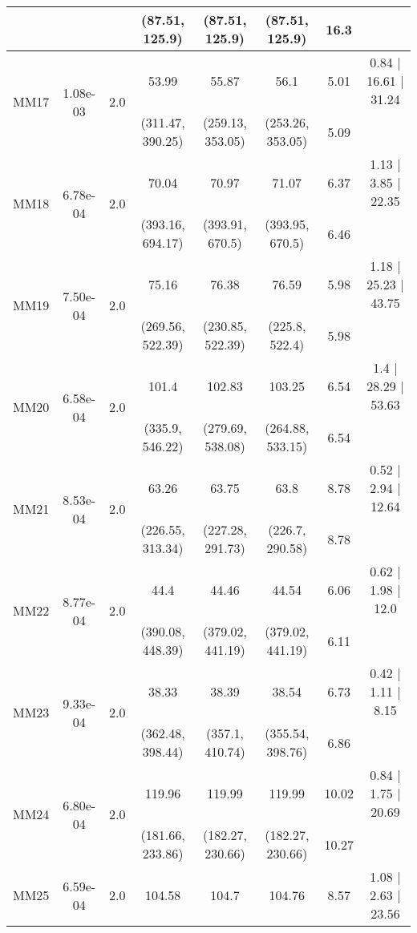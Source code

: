 \begin{longtable}{|c|c|c|c|c|c|c|c|}
	 &  &  & (87.51, 125.9) & (87.51, 125.9) & (87.51, 125.9) & 16.3 & \\
 	\hline
	\multirow{2}{*}{MM17} & \multirow{2}{*}{1.08e-03} & \multirow{2}{*}{2.0} & 53.99 & 55.87 & 56.1 & 5.01 & 0.84 $\mid$ 16.61 $\mid$ 31.24\\
	 &  &  & (311.47, 390.25) & (259.13, 353.05) & (253.26, 353.05) & 5.09 & \\
 	\hline
	\multirow{2}{*}{MM18} & \multirow{2}{*}{6.78e-04} & \multirow{2}{*}{2.0} & 70.04 & 70.97 & 71.07 & 6.37 & 1.13 $\mid$ 3.85 $\mid$ 22.35\\
	 &  &  & (393.16, 694.17) & (393.91, 670.5) & (393.95, 670.5) & 6.46 & \\
 	\hline
	\multirow{2}{*}{MM19} & \multirow{2}{*}{7.50e-04} & \multirow{2}{*}{2.0} & 75.16 & 76.38 & 76.59 & 5.98 & 1.18 $\mid$ 25.23 $\mid$ 43.75\\
	 &  &  & (269.56, 522.39) & (230.85, 522.39) & (225.8, 522.4) & 5.98 & \\
 	\hline
	\multirow{2}{*}{MM20} & \multirow{2}{*}{6.58e-04} & \multirow{2}{*}{2.0} & 101.4 & 102.83 & 103.25 & 6.54 & 1.4 $\mid$ 28.29 $\mid$ 53.63\\
	 &  &  & (335.9, 546.22) & (279.69, 538.08) & (264.88, 533.15) & 6.54 & \\
 	\hline
	\multirow{2}{*}{MM21} & \multirow{2}{*}{8.53e-04} & \multirow{2}{*}{2.0} & 63.26 & 63.75 & 63.8 & 8.78 & 0.52 $\mid$ 2.94 $\mid$ 12.64\\
	 &  &  & (226.55, 313.34) & (227.28, 291.73) & (226.7, 290.58) & 8.78 & \\
 	\hline
	\multirow{2}{*}{MM22} & \multirow{2}{*}{8.77e-04} & \multirow{2}{*}{2.0} & 44.4 & 44.46 & 44.54 & 6.06 & 0.62 $\mid$ 1.98 $\mid$ 12.0\\
	 &  &  & (390.08, 448.39) & (379.02, 441.19) & (379.02, 441.19) & 6.11 & \\
 	\hline
	\multirow{2}{*}{MM23} & \multirow{2}{*}{9.33e-04} & \multirow{2}{*}{2.0} & 38.33 & 38.39 & 38.54 & 6.73 & 0.42 $\mid$ 1.11 $\mid$ 8.15\\
	 &  &  & (362.48, 398.44) & (357.1, 410.74) & (355.54, 398.76) & 6.86 & \\
 	\hline
	\multirow{2}{*}{MM24} & \multirow{2}{*}{6.80e-04} & \multirow{2}{*}{2.0} & 119.96 & 119.99 & 119.99 & 10.02 & 0.84 $\mid$ 1.75 $\mid$ 20.69\\
	 &  &  & (181.66, 233.86) & (182.27, 230.66) & (182.27, 230.66) & 10.27 & \\
 	\hline
	\multirow{2}{*}{MM25} & \multirow{2}{*}{6.59e-04} & \multirow{2}{*}{2.0} & 104.58 & 104.7 & 104.76 & 8.57 & 1.08 $\mid$ 2.63 $\mid$ 23.56\\

\end{longtable}
